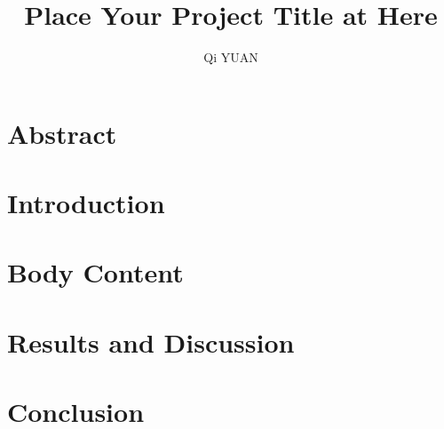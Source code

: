 \documentclass[12pt]{article}
\title{Place Your Project Title at Here}
\author{\textup{Qi YUAN}}
\begin{document}
    
    \tableofcontents
    \newpage

    \section{Abstract}

    \section{Introduction}

    \section{Body Content}

    \section{Results and Discussion}
    
    \section{Conclusion}

    
    
\end{document}
